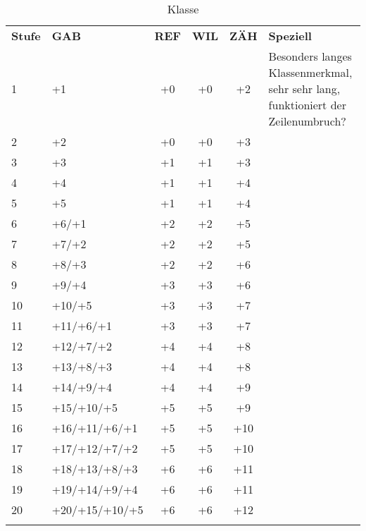 \documentclass[
	ngerman,
	a4paper,
	11pt,
	twocolumn,
]{scrartcl}
\newlength{\thicktableline}
\newlength{\thintableline}
\newlength{\aboveline}
\newlength{\belowline}
\begin{document}
\begin{table*}[htbp]
	\centering
	\caption{Klasse}
	\footnotesize
	\begin{tabularx}{\textwidth}{llcccX}
		\textbf{Stufe}	&\textbf{GAB}	&\textbf{REF}	&\textbf{WIL}	&\textbf{ZÄH}	&\textbf{Speziell}	\\	\specialrule{\thicktableline}{\aboveline}{\belowline}
		1		&+1				&+0		&+0		&+2		&Besonders langes Klassenmerkmal, sehr sehr lang, funktioniert der Zeilenumbruch?	\\	\specialrule{\thintableline}{\aboveline}{\belowline}
		2		&+2				&+0		&+0		&+3		&	\\	\specialrule{\thintableline}{\aboveline}{\belowline}
		3		&+3				&+1		&+1		&+3		&	\\	\specialrule{\thintableline}{\aboveline}{\belowline}
		4		&+4				&+1		&+1		&+4		&	\\	\specialrule{\thintableline}{\aboveline}{\belowline}
		5		&+5				&+1		&+1		&+4		&	\\	\specialrule{\thintableline}{\aboveline}{\belowline}
		6		&+6/+1			&+2		&+2		&+5		&	\\	\specialrule{\thintableline}{\aboveline}{\belowline}
		7		&+7/+2			&+2		&+2		&+5		&	\\	\specialrule{\thintableline}{\aboveline}{\belowline}
		8		&+8/+3			&+2		&+2		&+6		&	\\	\specialrule{\thintableline}{\aboveline}{\belowline}
		9		&+9/+4			&+3		&+3		&+6		&	\\	\specialrule{\thintableline}{\aboveline}{\belowline}
		10		&+10/+5			&+3		&+3		&+7		&	\\	\specialrule{\thintableline}{\aboveline}{\belowline}
		11		&+11/+6/+1		&+3		&+3		&+7		&	\\	\specialrule{\thintableline}{\aboveline}{\belowline}
		12		&+12/+7/+2		&+4		&+4		&+8		&	\\	\specialrule{\thintableline}{\aboveline}{\belowline}
		13		&+13/+8/+3		&+4		&+4		&+8		&	\\	\specialrule{\thintableline}{\aboveline}{\belowline}
		14		&+14/+9/+4		&+4		&+4		&+9		&	\\	\specialrule{\thintableline}{\aboveline}{\belowline}
		15		&+15/+10/+5		&+5		&+5		&+9		&	\\	\specialrule{\thintableline}{\aboveline}{\belowline}
		16		&+16/+11/+6/+1	&+5		&+5		&+10	&	\\	\specialrule{\thintableline}{\aboveline}{\belowline}
		17		&+17/+12/+7/+2	&+5		&+5		&+10	&	\\	\specialrule{\thintableline}{\aboveline}{\belowline}
		18		&+18/+13/+8/+3	&+6		&+6		&+11	&	\\	\specialrule{\thintableline}{\aboveline}{\belowline}
		19		&+19/+14/+9/+4	&+6		&+6		&+11	&	\\	\specialrule{\thintableline}{\aboveline}{\belowline}
		20		&+20/+15/+10/+5	&+6		&+6		&+12	&	\\	\specialrule{\thicktableline}{\aboveline}{\belowline}
	\end{tabularx}
\end{table*}
\end{document}
